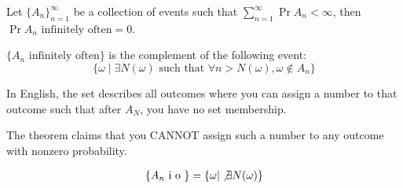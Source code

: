 \begin{theorem} 
    Let $\{A_n\}_{n = 1}^{\infty}$ be a collection of events such that $\sum_{n = 1}^{\infty} \Pr{A_n} < \infty$, then
    $\Pr{A_n \text{ infinitely often}} = 0$.

    $\{A_n \text{ infinitely often}\}$ is the complement of the following event:
    \[ \{\omega \mid \exists N(\omega) \text{ such that } \forall n > N(\omega), \omega \not\in A_n \} \]

    In English, the set describes all outcomes where you can assign a number to that outcome such that
    after $A_N$, you have no set membership.

    The theorem claims that you CANNOT assign such a number to any outcome with nonzero probability.
\end{theorem}

\begin{example} 
    \begin{align*}
        \{A_n \text{ i o } \} = \{ \omega | \not\exists N(\omega) \} \\
    \end{align*}
\end{example}